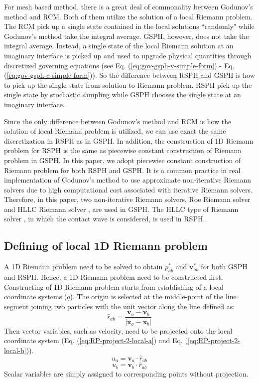 \documentclass[review]{elsarticle}
\begin{document}
For mesh based method, there is a great deal of commonality between Godunov's method and RCM. Both of them utilize the solution of a local Riemann problem. The RCM pick up a single state contained in the local solutions ``randomly" while Godunov's method take the integral average. 
GSPH, however, does not take the integral average. Instead, a single state of the local Riemann solution at an imaginary interface is picked up and used to upgrade physical quantities through discretized governing equations (see Eq. (\ref{eq:gov-gsph-v-simple-form}) - Eq. (\ref{eq:gov-gsph-e-simple-form})). So the difference between RSPH and GSPH is how to pick up the single state from solution to Riemann problem. RSPH pick up the single state by stochastic sampling while GSPH chooses the single state at an imaginary interface.

Since the only difference between Godunov's method and RCM is how the solution of local Riemann problem is utilized, we can use exact the same discretization in RSPH as in GSPH. In addition, the construction of 1D Riemann problem for RSPH is the same as piecewise constant construction of Riemann problem in GSPH. In this paper, we adopt piecewise constant construction of Riemann problem for both RSPH and GSPH.
It is a common practice in real implementation of Godunov's method to use approximate non-iterative Riemann solvers due to high computational cost associated with iterative Riemann solvers. Therefore, in this paper, two non-iterative Riemann solvers, Roe Riemann solver and HLLC Riemann solver \citep{toro1994restoration}, are used in GSPH. The HLLC type of Riemann solver \citep{toro1994restoration}, in which the contact wave is considered, is used in RSPH. 

\subsection{Defining of local 1D Riemann problem}
A 1D Riemann problem need to be solved to obtain  $p_{a b}^{\ast}$ and $\textbf{v}_{a b}^{\ast}$ for both GSPH and RSPH. Hence, a 1D Riemann problem need to be constructed first. Constructing of 1D Riemann problem starts from establishing of a local coordinate systems ($q$). The origin is selected at the middle-point of the line segment joining two particles with the unit vector along the line defined as: 
\begin{equation}
\hat{r}_{a b}= \frac{\textbf{v}_{a} - \textbf{v}_{ b}}{|\textbf{x}_{a} - \textbf{x}_{ b}|}
\end{equation}
Then vector variables, such as velocity, need to be projected onto the local coordinate system (Eq. (\ref{eq:RP-project-2-local-a}) and Eq. (\ref{eq:RP-project-2-local-b})). 
\begin{equation}
u_{a}= \textbf{v}_{a} \cdot \hat{r}_{a b}
\label{eq:RP-project-2-local-a}
\end{equation}
\begin{equation}
u_{b}= \textbf{v}_{b} \cdot \hat{r}_{a b}
\label{eq:RP-project-2-local-b}
\end{equation}
Scalar variables are simply assigned to corresponding points without projection.
\end{document}
